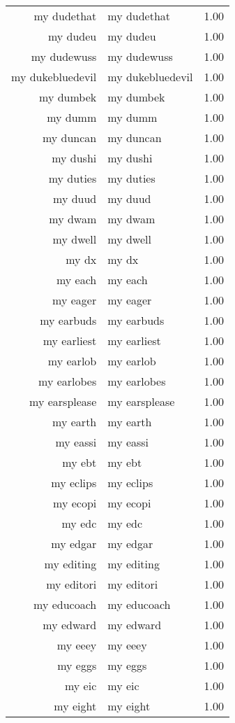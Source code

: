 \begin{table}[ht]
\begin{tabular}{rlr}
  my dudethat & my dudethat & 1.00 \\ 
  my dudeu & my dudeu & 1.00 \\ 
  my dudewuss & my dudewuss & 1.00 \\ 
  my dukebluedevil & my dukebluedevil & 1.00 \\ 
  my dumbek & my dumbek & 1.00 \\ 
  my dumm & my dumm & 1.00 \\ 
  my duncan & my duncan & 1.00 \\ 
  my dushi & my dushi & 1.00 \\ 
  my duties & my duties & 1.00 \\ 
  my duud & my duud & 1.00 \\ 
  my dwam & my dwam & 1.00 \\ 
  my dwell & my dwell & 1.00 \\ 
  my dx & my dx & 1.00 \\ 
  my each & my each & 1.00 \\ 
  my eager & my eager & 1.00 \\ 
  my earbuds & my earbuds & 1.00 \\ 
  my earliest & my earliest & 1.00 \\ 
  my earlob & my earlob & 1.00 \\ 
  my earlobes & my earlobes & 1.00 \\ 
  my earsplease & my earsplease & 1.00 \\ 
  my earth & my earth & 1.00 \\ 
  my eassi & my eassi & 1.00 \\ 
  my ebt & my ebt & 1.00 \\ 
  my eclips & my eclips & 1.00 \\ 
  my ecopi & my ecopi & 1.00 \\ 
  my edc & my edc & 1.00 \\ 
  my edgar & my edgar & 1.00 \\ 
  my editing & my editing & 1.00 \\ 
  my editori & my editori & 1.00 \\ 
  my educoach & my educoach & 1.00 \\ 
  my edward & my edward & 1.00 \\ 
  my eeey & my eeey & 1.00 \\ 
  my eggs & my eggs & 1.00 \\ 
  my eic & my eic & 1.00 \\ 
  my eight & my eight & 1.00 \\ 

\end{tabular}
\end{table}
